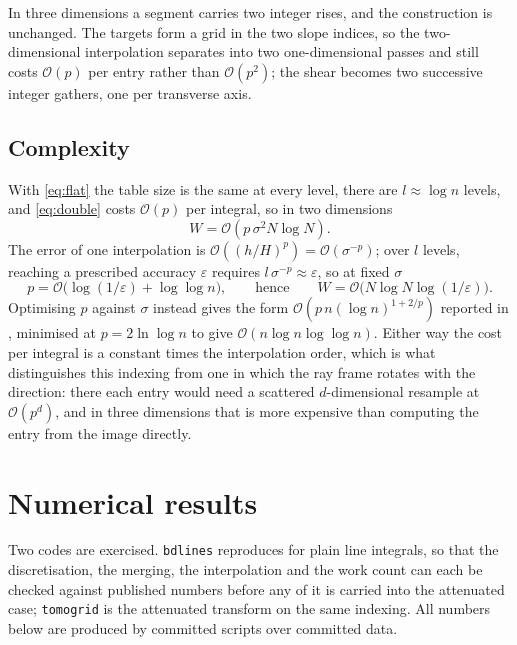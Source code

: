 \documentclass[11pt]{article}
\newcommand{\bigO}{\mathcal{O}}
\begin{document}
In three dimensions a segment carries two integer rises, and the construction is
unchanged. The targets form a grid in the two slope indices, so the
two-dimensional interpolation separates into two one-dimensional passes and
still costs $\bigO(p)$ per entry rather than $\bigO(p^2)$; the shear becomes two
successive integer gathers, one per transverse axis.

\subsection{Complexity}
\label{sec:complexity}

With \eqref{eq:flat} the table size is the same at every level, there are
$l \approx \log n$ levels, and \eqref{eq:double} costs $\bigO(p)$ per integral,
so in two dimensions
\begin{equation}
  W = \bigO(p\,\sigma^2 N \log N) .
\end{equation}
The error of one interpolation is $\bigO((h/H)^p) = \bigO(\sigma^{-p})$; over
$l$ levels, reaching a prescribed accuracy $\varepsilon$ requires
$l\,\sigma^{-p} \approx \varepsilon$, so at fixed $\sigma$
\begin{equation}
  p = \bigO\!\big(\log(1/\varepsilon) + \log\log n\big),
  \qquad\text{hence}\qquad
  W = \bigO\!\big(N \log N \log(1/\varepsilon)\big).
  \label{eq:cost}
\end{equation}
Optimising $p$ against $\sigma$ instead gives the form
$\bigO(p\,n(\log n)^{1+2/p})$ reported in \citep{brandtdym1999}, minimised at
$p = 2\ln\log n$ to give $\bigO(n \log n \log\log n)$. Either way the cost per
integral is a constant times the interpolation order, which is what
distinguishes this indexing from one in which the ray frame rotates with the
direction: there each entry would need a scattered $d$-dimensional resample at
$\bigO(p^d)$, and in three dimensions that is more expensive than computing the
entry from the image directly.

\section{Numerical results}
\label{sec:results}

Two codes are exercised. \texttt{bdlines} reproduces
\citep{brandtdym1999} for plain line integrals, so that the discretisation, the
merging, the interpolation and the work count can each be checked against
published numbers before any of it is carried into the attenuated case;
\texttt{tomogrid} is the attenuated transform on the same indexing. All numbers
below are produced by committed scripts over committed data.
\end{document}

